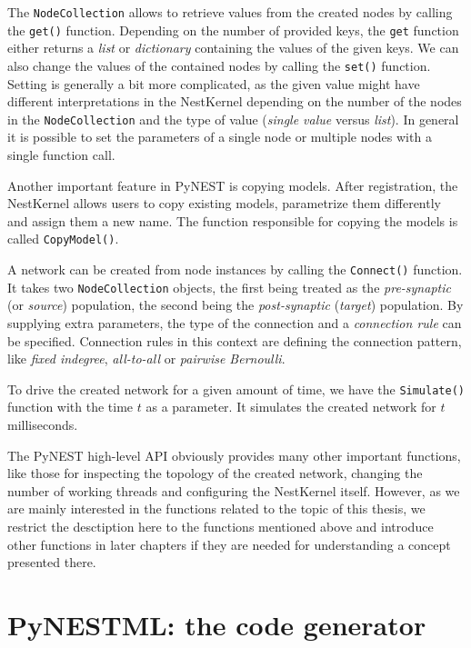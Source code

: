 The \texttt{NodeCollection} allows to retrieve values from the created nodes by calling the \texttt{get()} function. Depending on the number of provided keys, the \texttt{get} function either returns a \emph{list} or \emph{dictionary} containing the values of the given keys. We can also change the values of the contained nodes by calling the \texttt{set()} function. Setting is generally a bit more complicated, as the given value might have different interpretations in the NestKernel depending on the number of the nodes in the \texttt{NodeCollection} and the type of value (\emph{single value} versus \emph{list}). In general it is possible to set the parameters of a single node or multiple nodes with a single function call.

Another important feature in PyNEST is copying models. After registration, the NestKernel allows users to copy existing models, parametrize them differently and assign them a new name. The function responsible for copying the models is called \texttt{CopyModel()}.

A network can be created from node instances by calling the \texttt{Connect()} function. It takes two \texttt{NodeCollection} objects, the first being treated as the \emph{pre-synaptic} (or \emph{source}) population, the second being the \emph{post-synaptic} (\emph{target}) population. By supplying extra parameters, the type of the connection and a \emph{connection rule} can be specified. Connection rules in this context are defining the connection pattern, like \emph{fixed indegree}, \emph{all-to-all} or \emph{pairwise Bernoulli}.

To drive the created network for a given amount of time, we have the \texttt{Simulate()} function with the time $t$ as a parameter. It simulates the created network for $t$ milliseconds.

The PyNEST high-level API obviously provides many other important functions, like those for inspecting the topology of the created network, changing the number of working threads and configuring the NestKernel itself. However, as we are mainly interested in the functions related to the topic of this thesis, we restrict the desctiption here to the functions mentioned above and introduce other functions in later chapters if they are needed for understanding a concept presented there.

\section{PyNESTML: the code generator}

